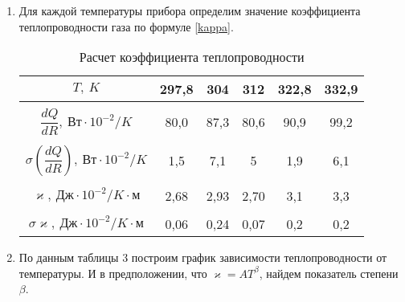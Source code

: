 \documentclass[a4paper,12pt]{article} %
\begin{document}
\begin{enumerate}
\item Для каждой температуры прибора определим значение коэффициента
теплопроводности газа по формуле \eqref{kappa}.
\begin{table}[!h]\centering
	\begin{tabular}{cccccc}
		\hline 
		$ T,~K $ & 297,8 & 304 & 312 & 322,8 & 332,9\\
		\hline\\[-2ex]
		$ \dfrac{dQ}{dR},~Вт\cdot 10^{-2}/K $ 
		& 80,0 & 87,3 & 80,6 & 90,9 & 99,2\\[2ex] 
		\hline \\[-2ex]
		$ \sigma\left(\dfrac{dQ}{dR}\right),~Вт\cdot 10^{-2}/K $ 
		& 1,5 & 7,1 & 5 & 1,9 & 6,1\\[2ex]
		\hline\\[-2ex]
		$ \varkappa,~Дж\cdot 10^{-2}/K\cdot м $
		& 2,68 & 2,93 & 2,70 & 3,1 & 3,3\\ 
		\hline\\[-2ex]
		$ \sigma\varkappa,~Дж\cdot 10^{-2}/K\cdot м $
		& 0,06 & 0,24 & 0,07 & 0,2 & 0,2\\ 
		\hline 
	\end{tabular} \caption{Расчет коэффициента теплопроводности}
\end{table}

\item По данным таблицы 3 построим график зависимости теплопроводности
от температуры. И в предположении, что $ \varkappa=AT^\beta $, найдем 
показатель степени $ \beta $.

\datatable

\begin{figure}[!h]\centering
	\datatable
	
\end{figure}



\end{enumerate}
\end{document}
